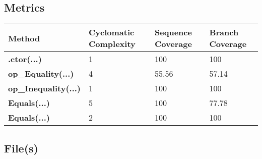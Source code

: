 \documentclass[a4paper,10pt]{article}
\begin{document}
\subsection{Metrics}
\begin{longtable}[l]{|l|l|l|l|}
\hline
\textbf{Method} & \textbf{Cyclomatic Complexity} & \textbf{Sequence Coverage} & \textbf{Branch Coverage}\\
\hline
\textbf{.ctor(...)} & 1 & 100 & 100\\
\hline
\textbf{op\_Equality(...)} & 4 & 55.56 & 57.14\\
\hline
\textbf{op\_Inequality(...)} & 1 & 100 & 100\\
\hline
\textbf{Equals(...)} & 5 & 100 & 77.78\\
\hline
\textbf{Equals(...)} & 2 & 100 & 100\\
\hline
\end{longtable}
\subsection{File(s)}
\end{document}

